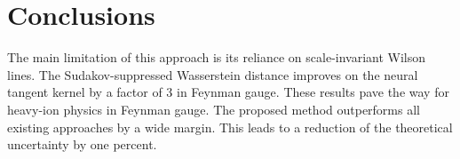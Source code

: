 \section{Conclusions}\label{sec:conclusions}

The main limitation of this approach is its reliance on scale-invariant
Wilson lines. The Sudakov-suppressed Wasserstein distance improves on
the neural tangent kernel by a factor of 3 in Feynman gauge. These
results pave the way for heavy-ion physics in Feynman gauge. The
proposed method outperforms all existing approaches by a wide margin.
This leads to a reduction of the theoretical uncertainty by one percent.

